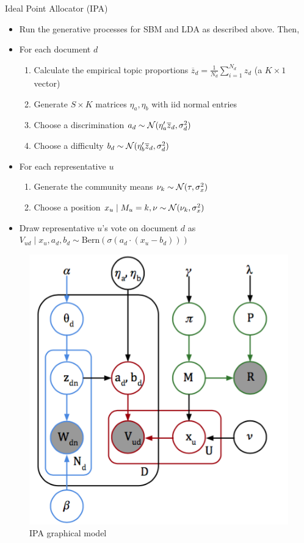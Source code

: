 \documentclass{article}
\begin{document}
\noindent Ideal Point Allocator (IPA)
\begin{itemize}
\item Run the generative processes for SBM and LDA as described above. Then,
\item For each document $d$
\begin{enumerate}
\item Calculate the empirical topic proportions $\overline z_d  = \frac{1}{N_d}\sum_{i=1}^{N_d}z_d$ (a $K\times 1$ vector)
\item Generate $S\times K$ matrices $\eta_a, \eta_b$ with iid normal entries 
\item Choose a discrimination $a_d \sim \mathcal{N}(\eta_{a}'\overline z_d,\sigma^2_d)$
\item Choose a difficulty $b_d \sim \mathcal{N}(\eta_{b}'\overline z_d,\sigma^2_d)$
\end{enumerate}
\item For each representative $u$
\begin{enumerate}
\item Generate the community means $\nu_k\sim \mathcal{N}(\tau, \sigma^2_x)$
\item Choose a position $x_u\mid M_u = k, \nu \sim \mathcal{N}(\nu_k,\sigma^2_x)$
\end{enumerate}
\item Draw representative $u$'s vote on document $d$ as $V_{ud} \mid x_u, a_d, b_d \sim \text{Bern}(\sigma(a_d\cdot(x_u-b_d)))$
\end{itemize}



\begin{figure}[h]
  \centering
  \includegraphics[scale=.4]{model.png}
  \caption{IPA graphical model}
\end{figure}
\end{document}

